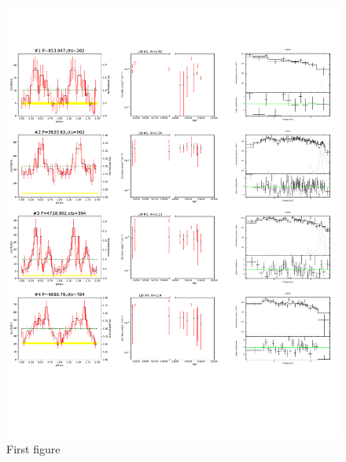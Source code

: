 \documentclass{article}
\begin{document}
	

\begin{figure}[ht]
  \centering
  \includegraphics[page=1,scale=0.9]{plot_figure_LW.pdf}
  \caption{First figure}
\end{figure}
\end{document}
